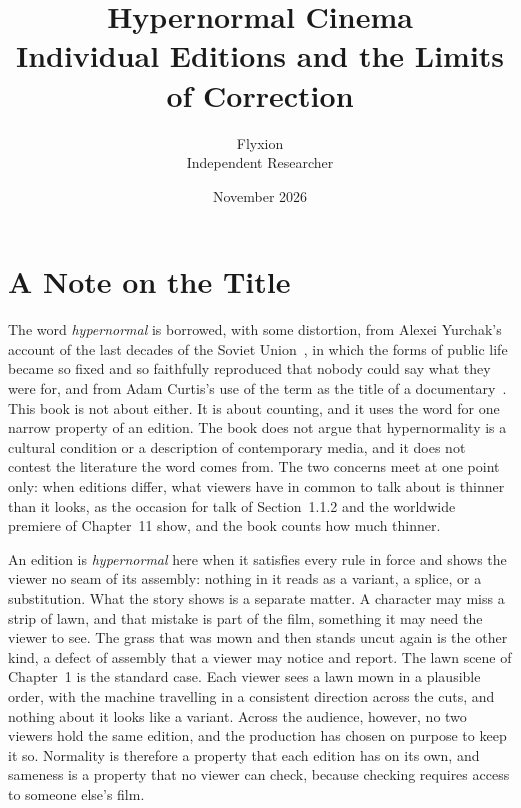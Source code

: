 \documentclass[11pt,twoside,openright]{book}
\title{\Huge\bfseries Hypernormal Cinema\\[1.2ex]
\large Individual Editions and the Limits of Correction}
\author{Flyxion\\[0.3ex]\small Independent Researcher}
\date{November 2026}
\theoremstyle{plain}
\theoremstyle{definition}
\theoremstyle{remark}
\begin{document}
\frontmatter
\maketitle
\tableofcontents
\mainmatter

\chapter*{A Note on the Title}

The word \emph{hypernormal} is borrowed, with some distortion, from Alexei Yurchak's account of the last decades of the Soviet Union~\cite{yurchak2006}, in which the forms of public life became so fixed and so faithfully reproduced that nobody could say what they were for, and from Adam Curtis's use of the term as the title of a documentary~\cite{curtis2016}. This book is not about either. It is about counting, and it uses the word for one narrow property of an edition. The book does not argue that hypernormality is a cultural condition or a description of contemporary media, and it does not contest the literature the word comes from. The two concerns meet at one point only: when editions differ, what viewers have in common to talk about is thinner than it looks, as the occasion for talk of Section~1.1.2 and the worldwide premiere of Chapter~11 show, and the book counts how much thinner.

An edition is \emph{hypernormal} here when it satisfies every rule in force and shows the viewer no seam of its assembly: nothing in it reads as a variant, a splice, or a substitution. What the story shows is a separate matter. A character may miss a strip of lawn, and that mistake is part of the film, something it may need the viewer to see. The grass that was mown and then stands uncut again is the other kind, a defect of assembly that a viewer may notice and report. The lawn scene of Chapter~1 is the standard case. Each viewer sees a lawn mown in a plausible order, with the machine travelling in a consistent direction across the cuts, and nothing about it looks like a variant. Across the audience, however, no two viewers hold the same edition, and the production has chosen on purpose to keep it so. Normality is therefore a property that each edition has on its own, and sameness is a property that no viewer can check, because checking requires access to someone else's film.
\end{document}
